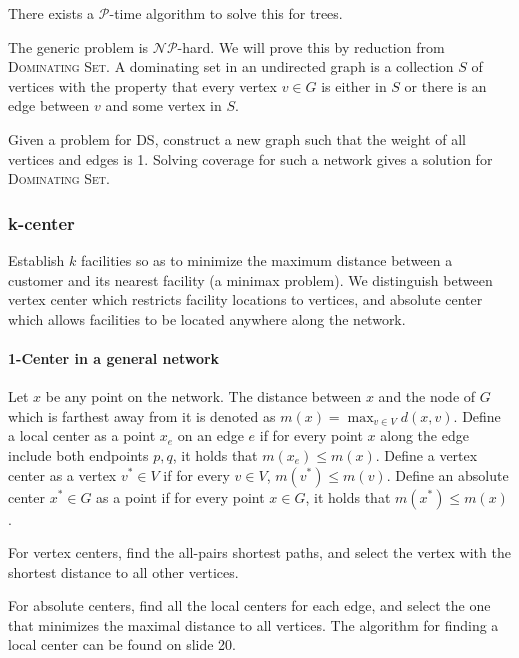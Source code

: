 \documentclass{idc_msc}
\newcommand{\NPclass}{\mathcal{NP}}
\newcommand{\Pclass}{\mathcal{P}}
\begin{document}
There exists a \(\Pclass\)-time algorithm to solve this for trees.

The generic problem is \(\NPclass\)-hard.
We will prove this by reduction from \textsc{Dominating Set}.
A dominating set in an undirected graph is a collection \(S\) of vertices with the property that every vertex \(v \in G\) is either in \(S\) or there is an edge between \(v\) and some vertex in \(S\).

Given a problem for \textsc{DS}, construct a new graph such that the weight of all vertices and edges is 1.
Solving coverage for such a network gives a solution for \textsc{Dominating Set}.

\subsubsection{k-center}

Establish \(k\) facilities so as to minimize the maximum distance between a customer and its nearest facility (a minimax problem).
We distinguish between vertex center which restricts facility locations to vertices, and absolute center which allows facilities to be located anywhere along the network.

\paragraph{1-Center in a general network}

Let \(x\) be any point on the network.
The distance between \(x\) and the node of \(G\) which is farthest away from it is denoted as \(m(x) = \max_{v \in V} d(x,v)\).
Define a local center as a point \(x_e\) on an edge \(e\) if for every point \(x\) along the edge include both endpoints \(p, q\), it holds that \(m(x_e) \le m(x)\).
Define a vertex center as a vertex \(v^* \in V\) if for every \(v \in V\), \(m(v^*) \le m(v)\).
Define an absolute center \(x^* \in G\) as a point if for every point \(x \in G\), it holds that \(m(x^*) \le m(x)\).

For vertex centers, find the all-pairs shortest paths, and select the vertex with the shortest distance to all other vertices.

For absolute centers, find all the local centers for each edge, and select the one that minimizes the maximal distance to all vertices.
The algorithm for finding a local center can be found on slide 20.
\end{document}
